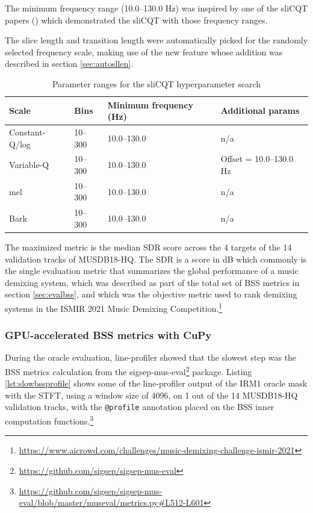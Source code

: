 \documentclass[report.tex]{subfiles}
\begin{document}
The minimum frequency range (10.0--130.0 Hz) was inspired by one of the sliCQT papers (\cite{slicq}) which demonstrated the sliCQT with those frequency ranges.

The slice length and transition length were automatically picked for the randomly selected frequency scale, making use of the new feature whose addition was described in section \ref{sec:autosllen}.

\begin{table}[ht]
	\centering
\begin{tabular}{ |l|l|l|l| }
	 \hline
	 Scale & Bins & Minimum frequency (Hz) & Additional params \\
	 \hline
	 \hline
	 Constant-Q/log & 10--300 & 10.0--130.0 & n/a \\
	 \hline
	 Variable-Q & 10--300 & 10.0--130.0 & Offset = 10.0--130.0 Hz \\
	 \hline
	 \hline
	 mel & 10--300 & 10.0--130.0 & n/a \\
	 \hline
	 Bark & 10--300 & 10.0--130.0 & n/a \\
	 \hline
\end{tabular}
	\caption{Parameter ranges for the sliCQT hyperparameter search}
	\label{table:slicqparams}
\end{table}

The maximized metric is the median SDR score across the 4 targets of the 14 validation tracks of MUSDB18-HQ. The SDR is a score in dB which commonly is the single evaluation metric that summarizes the global performance of a music demixing system, which was described as part of the total set of BSS metrics in section \ref{sec:evalbss}, and which was the objective metric used to rank demixing systems in the ISMIR 2021 Music Demixing Competition.\footnote{\url{https://www.aicrowd.com/challenges/music-demixing-challenge-ismir-2021}}

\newpagefill

\subsubsection{GPU-accelerated BSS metrics with CuPy}

During the oracle evaluation, line-profiler showed that the slowest step was the BSS metrics calculation from the sigsep-mus-eval\footnote{\url{https://github.com/sigsep/sigsep-mus-eval}} package. Listing \ref{lst:slowbssprofile} shows some of the line-profiler output of the IRM1 oracle mask with the STFT, using a window size of 4096, on 1 out of the 14 MUSDB18-HQ validation tracks, with the \Verb#@profile# annotation placed on the BSS inner computation functions.\footnote{\url{https://github.com/sigsep/sigsep-mus-eval/blob/master/museval/metrics.py\#L512-L601}}
\end{document}
